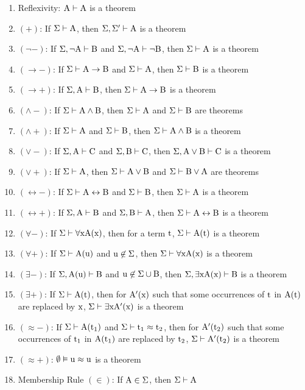 \documentclass[11pt,notitlepage]{report}
\begin{document}
\begin{enumerate}
    \item Reflexivity: $\rm A \vdash \rm A$ is a theorem
    \item $(+)$: If $\Sigma \vdash \rm A$, then $\Sigma, \Sigma' \vdash \rm A$ is a theorem
    \item $(\neg -)$: If $\Sigma, \neg \rm A \vdash \rm B$ and $\Sigma, \neg \rm A \vdash \neg \rm B$, then $\Sigma \vdash \rm A$ is a theorem
    \item $(\to -)$: If $\Sigma \vdash \rm A \to \rm B$ and $\Sigma \vdash \rm A$, then $\Sigma \vdash \rm B$ is a theorem
    \item $(\to +)$: If $\Sigma, \rm A \vdash \rm B$, then $\Sigma \vdash \rm A \to \rm B$ is a theorem
    \item $(\wedge -)$: If $\Sigma \vdash \rm A \wedge \rm B$, then $\Sigma \vdash \rm A$ and $\Sigma \vdash \rm B$ are theorems
    \item $(\wedge +)$: If $\Sigma \vdash \rm A$ and $\Sigma \vdash \rm B$, then $\Sigma \vdash \rm A \wedge \rm B$ is a theorem
    \item $(\vee -)$: If $\Sigma, \rm A \vdash \rm C$ and $\Sigma, \rm B \vdash \rm C$, then $\Sigma, \rm A \vee \rm B \vdash \rm C$ is a theorem
    \item $(\vee +)$: If $\Sigma \vdash \rm A$, then $\Sigma \vdash \rm A \vee \rm B$ and $\Sigma \vdash \rm B \vee A$ are theorems
    \item $(\leftrightarrow -)$: If $\Sigma \vdash \rm A \leftrightarrow \rm B$ and $\Sigma \vdash \rm B$, then $\Sigma \vdash \rm A$ is a theorem
    \item $(\leftrightarrow + )$: If $\Sigma, \rm A \vdash \rm B$ and $\Sigma, \rm B \vdash \rm A$, then $\Sigma \vdash \rm A \leftrightarrow \rm B$ is a theorem
    \item $(\forall -)$: If $\Sigma \vdash \rm \forall x A(x)$, then for a term $\rm t$, $\Sigma \vdash \rm A(t)$ is a theorem
    \item $(\forall +)$: If $\Sigma \vdash \rm A(u)$ and $\rm u \not \in \Sigma$, then $\rm \Sigma \vdash \forall x \rm A(x)$ is a theorem
    \item $(\exists -)$: If $\rm \Sigma, A(u) \vdash B$ and $\rm u \not \in \Sigma \cup \rm B$, then $\rm \Sigma, \exists x A(x) \vdash B$ is a theorem
    \item $(\exists +)$: If $\rm \Sigma \vdash A(t)$, then for $\rm A'(x)$ such that some occurrences of $\rm t$ in $\rm A(t)$ are replaced by $\rm x$, $\rm \Sigma \vdash \exists x \rm A'(x)$ is a theorem
    \item $(\approx -)$: If $\rm \Sigma \vdash A(t_1)$ and $\rm \Sigma \vdash t_1 \approx t_2$, then for $\rm A'(t_2)$ such that some occurrences of $\rm t_1$ in $\rm A(t_1)$ are replaced by $\rm t_2$, $\rm \Sigma \vdash A'(t_2)$ is a theorem
    \item $(\approx +)$: $\emptyset \rm \vDash u \approx u$ is a theorem
    \item Membership Rule $(\in)$: If $\rm A \in \Sigma$, then $\Sigma \vdash \rm A$
\end{enumerate}
\end{document}
